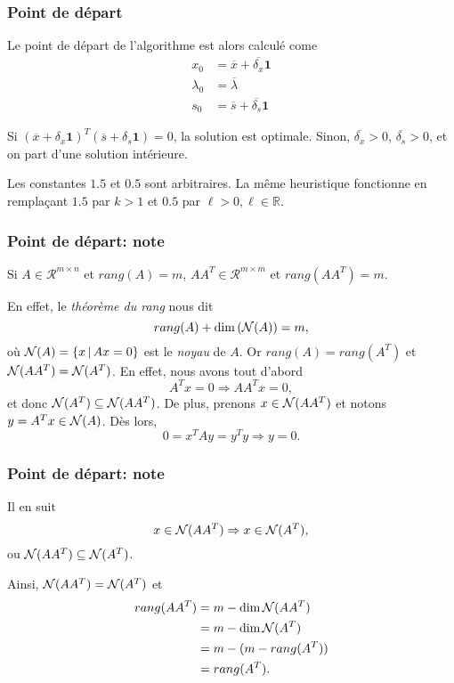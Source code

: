 \documentclass[usepdftitle=false, aspectratio=169]{beamer}
\def\bone{\boldsymbol{1}}
\def\RR{\mathcal{R}}
\begin{document}
\begin{frame}
\frametitle{Point de départ}

Le point de départ de l'algorithme est alors calculé come
\begin{align*}
x_0 &= \overline{x} + \overline{\delta_x} \bone \\
\lambda_0 &= \overline{\lambda} \\
s_0 &= \overline{s} + \overline{\delta_s} \bone
\end{align*}

\mbox{}

Si $(\overline{x} + \delta_x \bone)^T(\overline{s} + \delta_s \bone) = 0$, la solution est optimale.
Sinon, $\overline{\delta_x} > 0$, $\overline{\delta_s} > 0$, et on part d'une solution intérieure.

\mbox{}

Les constantes $1.5$ et $0.5$ sont arbitraires. La même heuristique fonctionne en remplaçant $1.5$ par $k > 1$ et $0.5$ par $\ell > 0, \ell \in \mathbb{R}$.

\end{frame}

\begin{frame}
\frametitle{Point de départ: note}

Si $A \in \RR^{m \times n}$ et $rang(A) = m$, $AA^T \in \RR^{m \times m}$ et $rang(AA^T) = m$.

\mbox{}

En effet, le \textit{théorème du rang} nous dit
$$
rang(A) + \dim \left( {\mathcal{N}}(A) \right) = m,
$$
où ${\mathcal{N}}(A) = \{ x \,|\, Ax = 0 \}$ est le \textit{noyau} de $A$. Or $rang(A) = rang(A^T)$ et ${\mathcal{N}}(AA^T) = {\mathcal{N}}(A^T)$. En effet, nous avons tout d'abord
$$
A^Tx = 0 \Rightarrow AA^Tx = 0,
$$
et donc ${\mathcal{N}}(A^T) \subseteq {\mathcal{N}}(AA^T)$. De plus, prenons $x \in {\mathcal{N}}(AA^T)$ et notons $y = A^Tx \in {\mathcal{N}}(A)$. Dès lors,
$$
0 = x^TAy = y^Ty \Rightarrow y = 0.
$$

\end{frame}

\begin{frame}
\frametitle{Point de départ: note}

Il en suit
$$
x \in {\mathcal{N}}(AA^T) \Rightarrow x \in {\mathcal{N}}(A^T),
$$
ou ${\mathcal{N}}(AA^T) \subseteq {\mathcal{N}}(A^T)$.

\mbox{}

Ainsi, ${\mathcal{N}}(AA^T) = {\mathcal{N}}(A^T)$ et
\begin{align*}
rang(AA^T) &= m - \dim{\mathcal{N}}(AA^T) \\ &= m - \dim{\mathcal{N}}(A^T) \\ &= m - (m - rang(A^T)) \\ & = rang(A^T).
\end{align*}

\end{frame}
\end{document}
